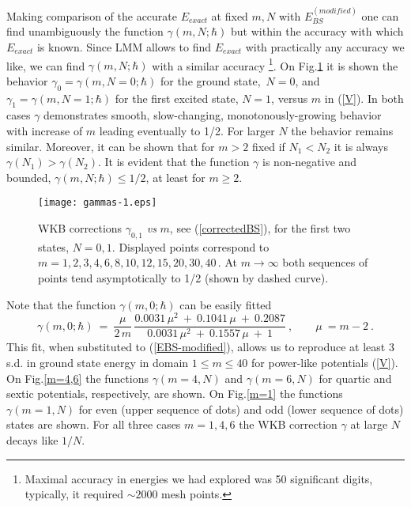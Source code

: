\documentclass[preprint,preprintnumbers,amsmath,amssymb]{revtex4}
\newcommand{\rar}{\rightarrow}
\begin{document}
Making comparison of the accurate $E_{exact}$ at fixed $m,N$ with $E^{(modified)}_{BS}$ one can find unambiguously the function $\gamma(m,N;\hbar)$ but within the accuracy with which $E_{exact}$ is known.
Since LMM allows to find $E_{exact}$ with practically any accuracy we like, we can find $\gamma(m,N;\hbar)$ with a similar accuracy \footnote{Maximal accuracy in energies we had explored was 50 significant digits, typically, it required $\sim 2000$ mesh points.}.
On Fig.\ref{N=0,1} it is shown the behavior $\gamma_0=\gamma(m,N=0;\hbar)$ for the ground state,\ $N=0$, and $\gamma_1=\gamma(m,N=1;\hbar)$ for the first excited state, $N=1$,
versus $m$ in (\ref{V}). In both cases $\gamma$ demonstrates smooth, slow-changing, monotonously-growing behavior with increase of $m$ leading eventually to 1/2. For larger $N$ the behavior remains similar. Moreover, it can be shown that for $m > 2$ fixed if $N_1 < N_2$ it is always $\gamma(N_1) > \gamma(N_2)$. It is evident that the function $\gamma$ is non-negative and bounded, $\gamma(m,N;\hbar) \leq 1/2$, at least for $m \geq 2$.

\begin{figure}[h]
	\centering
	\texttt{[image: gammas-1.eps]}
	\caption{\label{N=0,1} WKB corrections $\gamma_{0,1}$ {\it vs} $m$,
              see (\ref{correctedBS}), for the first two states, $N=0,1$. Displayed
              points correspond to $m=1,2,3,4,6,8,10,12,15,20,30,40$\,. At $m \rar \infty$ both sequences of points tend asymptotically to 1/2 (shown by dashed curve).}
\end{figure}

Note that the function $\gamma(m,0;\hbar)$ can be easily fitted
\begin{equation}
      \gamma(m,0;\hbar)\ =\ \frac{\mu}{2\,m}\,\frac{0.0031\,\mu^2\ +\ 0.1041\,\mu\  +\ 0.2087 }{0.0031\,\mu^2\  +\ 0.1557\,\mu\ +\ 1}\ ,\qquad \mu\ =m-2\ .
\label{fit}
\end{equation}
This fit, when substituted to (\ref{EBS-modified}), allows us to reproduce at least 3 s.d. in ground state energy in domain $1 \leq m \leq 40$ for power-like potentials (\ref{V}). On Fig.\ref{m=4,6} the functions $\gamma(m=4,N)$ and $\gamma(m=6,N)$  for quartic and sextic potentials, respectively, are shown.
On Fig.\ref{m=1} the functions $\gamma(m=1,N)$ for even (upper sequence of dots) and odd (lower sequence of dots) states are shown. For all three cases $m=1,4,6$ the WKB correction $\gamma$ at large $N$ decays like $1/N$.
\end{document}
